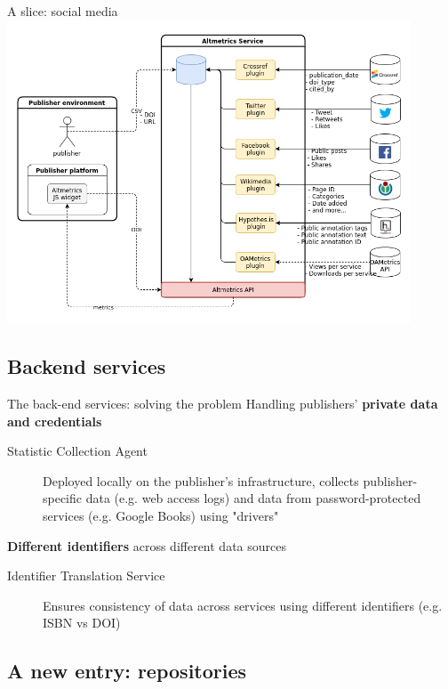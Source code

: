 \documentclass[xcolor=svgnames]{beamer}
\begin{document}
        \begin{frame}{A slice: social media}
            \includegraphics[width=0.9\textwidth]{img/h5}
        \end{frame}

    \subsection{Backend services}

        \begin{frame}{The back-end services: solving the problem}
            Handling publishers' \textbf{private data and credentials}
            \pause
            \begin{description}
                \item [Statistic Collection Agent] Deployed locally on the publisher's infrastructure, collects publisher-specific data (e.g. web access logs) and data from password-protected services (e.g. Google Books) using "drivers"
            \end{description}
            \pause
            \vspace{0.05\textheight}
            \textbf{Different identifiers} across different data sources
            \pause
            \begin{description}
                \item [Identifier Translation Service] Ensures consistency of data across services using different identifiers (e.g. ISBN vs DOI)
            \end{description}
        \end{frame}

    \subsection{A new entry: repositories}
\end{document}
